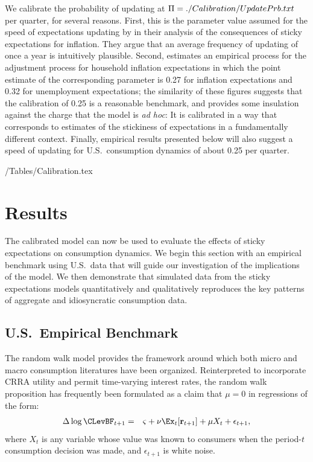 We calibrate the probability of updating at $\Pi=  {./Calibration/UpdatePrb.txt}$ per quarter, for several reasons.  First, this is the parameter value assumed for the speed of expectations updating by \cite{mrSlumps} in their analysis of the consequences of sticky expectations for inflation.  They argue that an average frequency of updating of once a year is intuitively plausible.  Second, \cite{carroll:epidemicinflQJE} estimates an empirical process for the adjustment process for household inflation expectations in which the point estimate of the corresponding parameter is 0.27 for inflation expectations and 0.32 for unemployment expectations; the similarity of these figures suggests that the \cite{mrSlumps} calibration of 0.25 is a reasonable benchmark, and provides some insulation against the charge that the model is {\it ad hoc}: It is calibrated in a way that corresponds to estimates of the stickiness of expectations in a fundamentally different context.  Finally, empirical results presented below will also suggest a speed of updating for U.S.\ consumption dynamics of about 0.25 per quarter.

\econtexRoot/Tables/Calibration.tex


\section{Results}\label{sec:Results}

The calibrated model can now be used to evaluate the effects of sticky expectations on consumption dynamics.  We begin this section with an empirical benchmark using U.S.\ data that will guide our investigation of the implications of the model.  We then demonstrate that simulated data from the sticky expectations models quantitatively and qualitatively reproduces the key patterns of aggregate and idiosyncratic consumption data.

\subsection{U.S.\ Empirical Benchmark}
\label{sec:EmpBenchmark}

The random walk model provides the framework around which both micro and macro consumption literatures have been organized.  Reinterpreted to incorporate CRRA utility and permit time-varying interest rates, the random walk proposition has frequently been formulated as a claim that $\mu=0$ in regressions of the form:
\begin{eqnarray}
  \label{eq:RandomWalkCRRA}
  \Delta \log \CLevBF_{t+1} & = & \varsigma+\nu \Ex_{t}[\mathbf{r}_{t+1}]+\mu X_{t}+\epsilon_{t+1},
\end{eqnarray}
where $X_{t}$ is any variable whose value was known to consumers
when the period-$t$ consumption decision was made, and $\epsilon_{t+1}$
is white noise.

